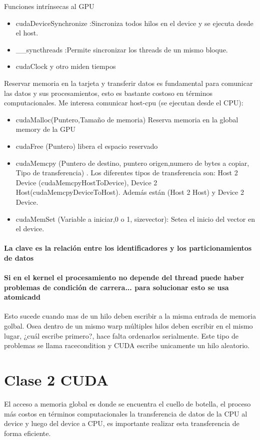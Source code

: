 \documentclass[]{scrartcl}
\begin{document}
Funciones intrínsecas al GPU


\begin{itemize}
	\item cudaDeviceSynchronize :Sincroniza todos hilos en el device y se ejecuta desde el host. 
	\item \_\_syncthreads  :Permite sincronizar los threads de un mismo bloque. 
	\item cudaClock y otro miden tiempos
\end{itemize}

Reservar memoria en la tarjeta y transferir datos es fundamental para comunicar las datos y sus procesamientos, esto es bastante costoso en términos computacionales. Me interesa comunicar host-cpu (se ejecutan desde el CPU):
\begin{itemize}
	\item cudaMalloc(Puntero,Tamaño de memoria) Reserva memoria en la global memory de la GPU
	\item cudaFree (Puntero) libera el espacio reservado
	\item cudaMemcpy (Puntero de destino, puntero origen,numero de bytes a copiar, Tipo de transferencia) . Los diferentes tipos de transferencia son:  Host 2 Device (cudaMemcpyHostToDevice), Device 2 Host(cudaMemcpyDeviceToHost). Además están (Host 2 Host) y Device 2 Device.
	\item cudaMemSet (Variable a iniciar,0 o 1, sizevector): Setea el inicio del vector en el device.
\end{itemize}

\paragraph{La clave es la relación entre los identificadores y los particionamientos de datos}
\paragraph{Si en el kernel el procesamiento no depende del thread puede haber problemas de condición de carrera... para solucionar esto se usa atomicadd} Esto sucede cuando mas de un hilo deben escribir a la misma entrada de memoria golbal. Osea dentro de un mismo warp múltiples hilos deben escribir en el mismo lugar, ¿cuál escribe primero?, hace falta ordenarlos serialmente. Este tipo de problemas se llama racecondition y CUDA escribe unicamente un hilo aleatorio. 




\section{Clase 2 CUDA}
El acceso a memoria global es donde se encuentra el cuello de botella, el proceso más costos en términos computacionales la transferencia de datos de la CPU al device y luego del device a CPU, es importante realizar esta transferencia de forma eficiente. 
\end{document}
